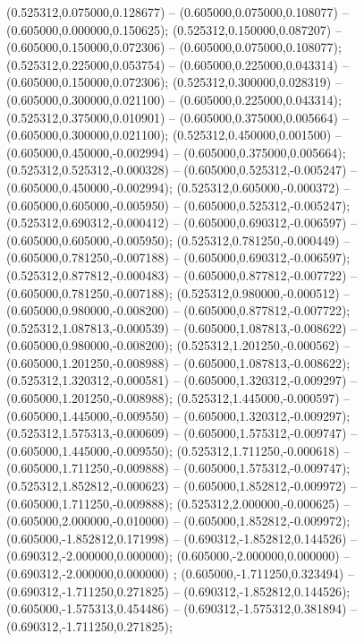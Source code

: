  (0.525312,0.075000,0.128677) -- (0.605000,0.075000,0.108077) -- (0.605000,0.000000,0.150625);
 (0.525312,0.150000,0.087207) -- (0.605000,0.150000,0.072306) -- (0.605000,0.075000,0.108077);
 (0.525312,0.225000,0.053754) -- (0.605000,0.225000,0.043314) -- (0.605000,0.150000,0.072306);
 (0.525312,0.300000,0.028319) -- (0.605000,0.300000,0.021100) -- (0.605000,0.225000,0.043314);
 (0.525312,0.375000,0.010901) -- (0.605000,0.375000,0.005664) -- (0.605000,0.300000,0.021100);
 (0.525312,0.450000,0.001500) -- (0.605000,0.450000,-0.002994) -- (0.605000,0.375000,0.005664);
 (0.525312,0.525312,-0.000328) -- (0.605000,0.525312,-0.005247) -- (0.605000,0.450000,-0.002994);
 (0.525312,0.605000,-0.000372) -- (0.605000,0.605000,-0.005950) -- (0.605000,0.525312,-0.005247);
 (0.525312,0.690312,-0.000412) -- (0.605000,0.690312,-0.006597) -- (0.605000,0.605000,-0.005950);
 (0.525312,0.781250,-0.000449) -- (0.605000,0.781250,-0.007188) -- (0.605000,0.690312,-0.006597);
 (0.525312,0.877812,-0.000483) -- (0.605000,0.877812,-0.007722) -- (0.605000,0.781250,-0.007188);
 (0.525312,0.980000,-0.000512) -- (0.605000,0.980000,-0.008200) -- (0.605000,0.877812,-0.007722);
 (0.525312,1.087813,-0.000539) -- (0.605000,1.087813,-0.008622) -- (0.605000,0.980000,-0.008200);
 (0.525312,1.201250,-0.000562) -- (0.605000,1.201250,-0.008988) -- (0.605000,1.087813,-0.008622);
 (0.525312,1.320312,-0.000581) -- (0.605000,1.320312,-0.009297) -- (0.605000,1.201250,-0.008988);
 (0.525312,1.445000,-0.000597) -- (0.605000,1.445000,-0.009550) -- (0.605000,1.320312,-0.009297);
 (0.525312,1.575313,-0.000609) -- (0.605000,1.575312,-0.009747) -- (0.605000,1.445000,-0.009550);
 (0.525312,1.711250,-0.000618) -- (0.605000,1.711250,-0.009888) -- (0.605000,1.575312,-0.009747);
 (0.525312,1.852812,-0.000623) -- (0.605000,1.852812,-0.009972) -- (0.605000,1.711250,-0.009888);
 (0.525312,2.000000,-0.000625) -- (0.605000,2.000000,-0.010000) -- (0.605000,1.852812,-0.009972);
 (0.605000,-1.852812,0.171998) -- (0.690312,-1.852812,0.144526) -- (0.690312,-2.000000,0.000000);
 (0.605000,-2.000000,0.000000) -- (0.690312,-2.000000,0.000000) ;
 (0.605000,-1.711250,0.323494) -- (0.690312,-1.711250,0.271825) -- (0.690312,-1.852812,0.144526);
 (0.605000,-1.575313,0.454486) -- (0.690312,-1.575312,0.381894) -- (0.690312,-1.711250,0.271825);
